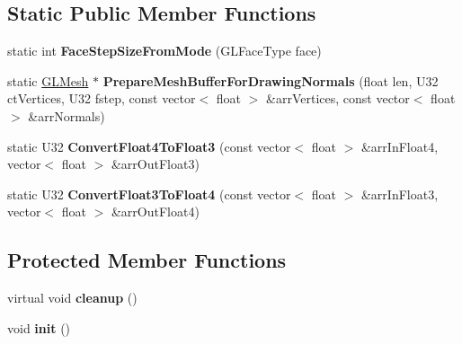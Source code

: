 \subsection*{Static Public Member Functions}
\begin{DoxyCompactItemize}
\item 
\hypertarget{classps_1_1opengl_1_1GLMesh_a187c41a36f2b8e4b08406796e436f228}{}static int {\bfseries Face\+Step\+Size\+From\+Mode} (G\+L\+Face\+Type face)\label{classps_1_1opengl_1_1GLMesh_a187c41a36f2b8e4b08406796e436f228}

\item 
\hypertarget{classps_1_1opengl_1_1GLMesh_a608789c7fc06893303139efd29d39865}{}static \hyperlink{classps_1_1opengl_1_1GLMesh}{G\+L\+Mesh} $\ast$ {\bfseries Prepare\+Mesh\+Buffer\+For\+Drawing\+Normals} (float len, U32 ct\+Vertices, U32 fstep, const vector$<$ float $>$ \&arr\+Vertices, const vector$<$ float $>$ \&arr\+Normals)\label{classps_1_1opengl_1_1GLMesh_a608789c7fc06893303139efd29d39865}

\item 
\hypertarget{classps_1_1opengl_1_1GLMesh_a089b4ed0bc4dde11f9eed688cb9123cb}{}static U32 {\bfseries Convert\+Float4\+To\+Float3} (const vector$<$ float $>$ \&arr\+In\+Float4, vector$<$ float $>$ \&arr\+Out\+Float3)\label{classps_1_1opengl_1_1GLMesh_a089b4ed0bc4dde11f9eed688cb9123cb}

\item 
\hypertarget{classps_1_1opengl_1_1GLMesh_a0f29f354fa6a2cbbdc56b9386c261570}{}static U32 {\bfseries Convert\+Float3\+To\+Float4} (const vector$<$ float $>$ \&arr\+In\+Float3, vector$<$ float $>$ \&arr\+Out\+Float4)\label{classps_1_1opengl_1_1GLMesh_a0f29f354fa6a2cbbdc56b9386c261570}

\end{DoxyCompactItemize}
\subsection*{Protected Member Functions}
\begin{DoxyCompactItemize}
\item 
\hypertarget{classps_1_1opengl_1_1GLMesh_a81b350e932dc71633a846b90537b12bd}{}virtual void {\bfseries cleanup} ()\label{classps_1_1opengl_1_1GLMesh_a81b350e932dc71633a846b90537b12bd}

\item 
\hypertarget{classps_1_1opengl_1_1GLMesh_a94b124096bb621f00db163240a08aa6d}{}void {\bfseries init} ()\label{classps_1_1opengl_1_1GLMesh_a94b124096bb621f00db163240a08aa6d}

\end{DoxyCompactItemize}

